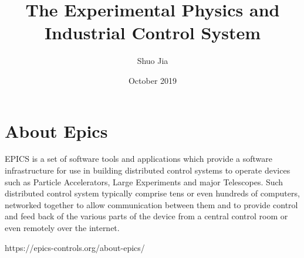 \documentclass{article}
\title{The Experimental Physics and Industrial Control System}
\author{Shuo Jia}
\date{October 2019}
\begin{document}
\maketitle

\section{About Epics}
EPICS is a set of software tools and applications which provide a software infrastructure for use in building distributed control systems to operate devices such as Particle Accelerators, Large Experiments and major Telescopes. Such distributed control system typically comprise tens or even hundreds of computers, networked together to allow communication between them and to provide control and feed back of the various parts of the device from a central control room or even remotely over the internet\cite{epicswebsite}. 
\begin{thebibliography}{unsrt}
https://epics-controls.org/about-epics/
\end{thebibliography}
\end{document}

